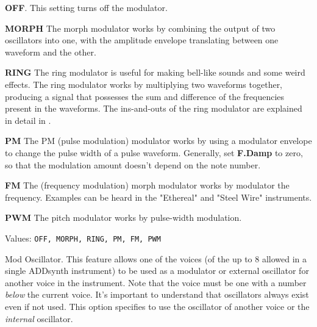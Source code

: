    \begin{enumber}
      \item \textbf{OFF}.
         This setting turns off the modulator.
      \item \textbf{MORPH}
         The morph modulator works by combining the output of two oscillators
         into one, with the amplitude envelope translating between one waveform
         and the other.
      \item \textbf{RING}
         The ring modulator is useful for making bell-like sounds and some
         weird effects.  The ring modulator works by multiplying two
         waveforms together, producing a signal that possesses the sum and
         difference of the frequencies present in the waveforms.  The
         ins-and-outs of the ring modulator are explained in detail in
         .
      \item \textbf{PM}
         The PM (pulse modulation) modulator works by using a modulator
         envelope to change the pulse width of a pulse waveform.
         Generally, set \textbf{F.Damp} to zero, so that the modulation amount
         doesn't depend on the note number.
      \item \textbf{FM}
         The (frequency modulation) morph modulator works by modulator the
         frequency.  Examples can be heard in the "Ethereal" and "Steel Wire"
         instruments.
      \item \textbf{PWM}
         The pitch modulator works by pulse-width modulation.
   \end{enumber}

   Values: \texttt{OFF, MORPH, RING, PM, FM, PWM}

   Mod Oscillator.
   This feature allows one of the voices (of the up to 8 allowed in a single
   ADDsynth instrument) to be used as a modulator or external oscillator for
   another voice in the instrument.
   Note that the voice must be one with a number \textsl{below} the current
   voice.
   It's important to understand that oscillators always exist even if not
   used.
   This option specifies to use the oscillator of another voice or
   the \textsl{internal} oscillator.

